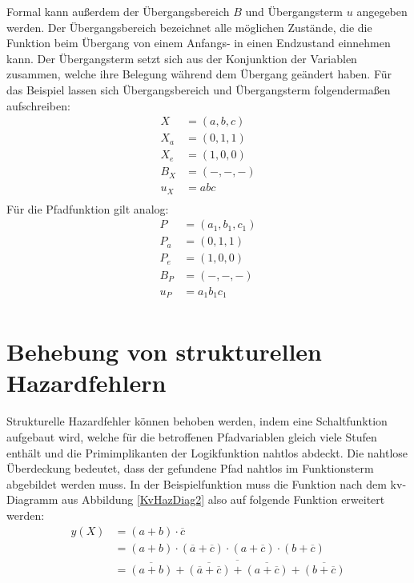 Formal kann außerdem der Übergangsbereich $B$ und Übergangsterm $u$ angegeben werden. Der Übergangsbereich bezeichnet alle möglichen Zustände, die die Funktion beim Übergang von einem Anfangs- in einen Endzustand einnehmen kann. Der Übergangsterm setzt sich aus der Konjunktion der Variablen zusammen, welche ihre Belegung während dem Übergang geändert haben. Für das Beispiel lassen sich Übergangsbereich und Übergangsterm folgendermaßen aufschreiben:
\begin{align*}
X   &= (a,b,c) \\
X_a &= (0,1,1) \\
X_e &= (1,0,0) \\
B_X &= (-,-,-) \\
u_X &= abc     \\
\end{align*}
Für die Pfadfunktion gilt analog:
\begin{align*}
P   &= (a_1,b_1,c_1) \\
P_a &= (0,1,1)       \\
P_e &= (1,0,0)       \\
B_P &= (-,-,-)       \\
u_P &= a_1b_1c_1     \\
\end{align*}

\section{Behebung von strukturellen Hazardfehlern}
\label{struktHazBeh}
Strukturelle Hazardfehler können behoben werden, indem eine Schaltfunktion aufgebaut wird, welche für die betroffenen Pfadvariablen gleich viele Stufen enthält und die Primimplikanten der Logikfunktion nahtlos abdeckt. Die nahtlose Überdeckung bedeutet, dass der gefundene Pfad nahtlos im Funktionsterm abgebildet werden muss. In der Beispielfunktion muss die Funktion nach dem {\sc kv}-Diagramm aus Abbildung \ref{KvHazDiag2} also auf folgende Funktion erweitert werden:
\begin{align*}
	y(X) &= (a + b) \cdot \overline{c} \\
	     &= (a + b) \cdot (\overline{a} + \overline{c}) \cdot (a + \overline{c}) \cdot (b + \overline{c}) \\
	     &= \overline{\overline{(a + b)} + \overline{(\overline{a} + \overline{c})} + \overline{(a + \overline{c})} + \overline{(b + \overline{c})}} \\
\end{align*} 


